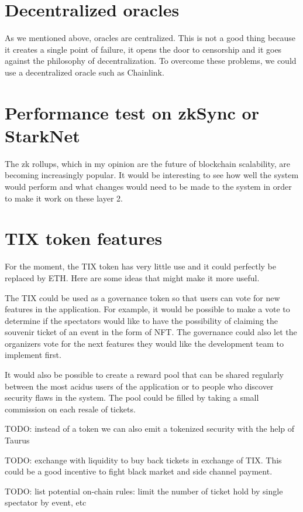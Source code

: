 \documentclass[a4paper,11pt,oneside]{report}
\begin{document}
\section{Decentralized oracles}
As we mentioned above, oracles are centralized. This is not a good thing because it creates a single point of failure, it opens the door to censorship and it goes against the philosophy of decentralization. To overcome these problems, we could use a decentralized oracle such as Chainlink.

\section{Performance test on zkSync or StarkNet}
The zk rollups, which in my opinion are the future of blockchain scalability, are becoming increasingly popular. It would be interesting to see how well the system would perform and what changes would need to be made to the system in order to make it work on these layer 2.

\section{TIX token features}
For the moment, the TIX token has very little use and it could perfectly be replaced by ETH. Here are some ideas that might make it more useful.

The TIX could be used as a governance token so that users can vote for new features in the application. For example, it would be possible to make a vote to determine if the spectators would like to have the possibility of claiming the souvenir ticket of an event in the form of NFT. The governance could also let the organizers vote for the next features they would like the development team to implement first.

It would also be possible to create a reward pool that can be shared regularly between the most acidus users of the application or to people who discover security flaws in the system. The pool could be filled by taking a small commission on each resale of tickets.

TODO: instead of a token we can also emit a tokenized security with the help of Taurus

TODO: exchange with liquidity to buy back tickets in exchange of TIX. This could be a good incentive to fight black market and side channel payment.

TODO: list potential on-chain rules: limit the number of ticket hold by single spectator by event, etc
\end{document}
